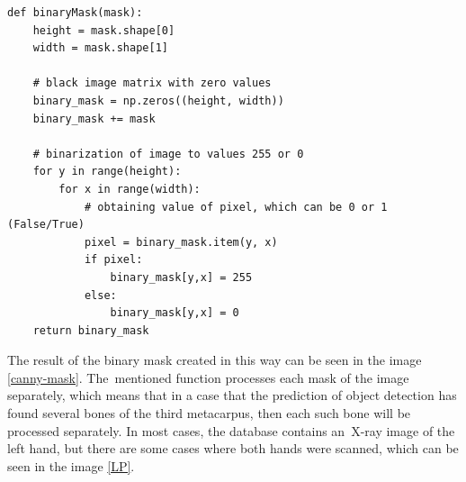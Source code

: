 \begin{lstlisting}[label={mask-code}, caption={\textbf{Python code function.} Function for binary mask creation.}]
def binaryMask(mask):
    height = mask.shape[0]
    width = mask.shape[1]
    
    # black image matrix with zero values
    binary_mask = np.zeros((height, width))
    binary_mask += mask

    # binarization of image to values 255 or 0
    for y in range(height):
        for x in range(width):
            # obtaining value of pixel, which can be 0 or 1 (False/True)
            pixel = binary_mask.item(y, x) 
            if pixel:
                binary_mask[y,x] = 255
            else:
                binary_mask[y,x] = 0
    return binary_mask
\end{lstlisting}

The result of the binary mask created in this way can be seen in the image \ref{canny-mask}. The~mentioned function processes each mask of the image separately, which means that in a case that the prediction of object detection has found several bones of the third metacarpus, then each such bone will be processed separately. In most cases, the database contains an~X-ray image of the left hand, but there are some cases where both hands were scanned, which can be seen in the image \ref{LP}.

